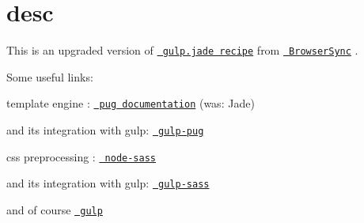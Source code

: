 \chapter{desc}
\hypertarget{md__d_1_2_g_i_t_2_food_link_2foodlink_8client_2node__modules_2bs-recipes_2recipes_2gulp_8pug_2desc}{}\label{md__d_1_2_g_i_t_2_food_link_2foodlink_8client_2node__modules_2bs-recipes_2recipes_2gulp_8pug_2desc}
This is an upgraded version of \href{https://github.com/Browsersync/recipes/tree/master/recipes/gulp.jade}{\texttt{ gulp.\+jade recipe}} from \href{https://github.com/browsersync/browser-sync}{\texttt{ Browser\+Sync}} .

Some useful links\+:


\begin{DoxyItemize}
\item template engine \+: \href{https://pugjs.org/api/reference.html}{\texttt{ pug documentation}} (was\+: Jade)
\begin{DoxyItemize}
\item and its integration with gulp\+: \href{https://www.npmjs.com/package/gulp-pug}{\texttt{ gulp-\/pug}}
\end{DoxyItemize}
\item css preprocessing \+: \href{https://www.npmjs.com/package/node-sass}{\texttt{ node-\/sass}}
\begin{DoxyItemize}
\item and its integration with gulp\+: \href{https://www.npmjs.com/package/gulp-pug}{\texttt{ gulp-\/sass}}
\end{DoxyItemize}
\item and of course \href{https://github.com/gulpjs/gulp/blob/master/docs/README.md}{\texttt{ gulp}} 
\end{DoxyItemize}